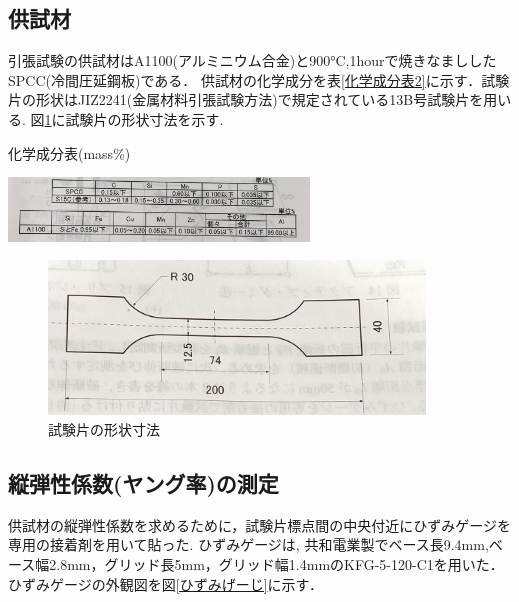 \documentclass[a4paper,11pt,uplatex]{jsarticle}
\begin{document}
\subsection{供試材}
引張試験の供試材はA1100(アルミニウム合金)と900°C,1hourで焼きなまししたSPCC(冷間圧延鋼板)である．
供試材の化学成分を表\ref{化学成分表2}に示す．試験片の形状はJIZ2241(金属材料引張試験方法)で規定されている13B号試験片を用いる.
図\ref{試験片}に試験片の形状寸法を示す.

\begin{table}[H]
  \begin{center}
    \caption{化学成分表(mass\%)}
    \includegraphics[width = 8cm]{画像/化学成分表.jpg}
    \label{化学成分表2}
  \end{center}
\end{table}


\begin{figure}[H]
  \begin{center}
    \includegraphics[width = 10cm]{画像/試験片.jpg}
    \caption{試験片の形状寸法}
    \label{試験片}
  \end{center}
\end{figure}

\subsection{縦弾性係数(ヤング率)の測定}
供試材の縦弾性係数を求めるために，試験片標点間の中央付近にひずみゲージを専用の接着剤を用いて貼った.
ひずみゲージは, 共和電業製でベース長9.4mm,ベース幅2.8mm，グリッド長5mm，グリッド幅1.4mmのKFG-5-120-C1を用いた．
ひずみゲージの外観図を図\ref{ひずみげーじ}に示す．
\end{document}
